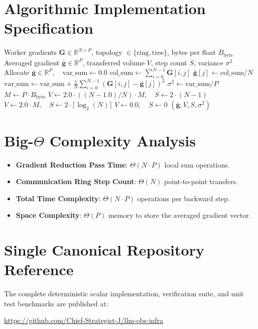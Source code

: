 \documentclass[11pt,a4paper]{article}
\theoremstyle{definition}
\begin{document}
\section{Algorithmic Implementation Specification}

\begin{algorithm}[H]
\caption{Data Parallel All-Reduce Gradient Averaging}
\begin{algorithmic}[1]
\Require Worker gradients $\mathbf{G} \in \mathbb{R}^{N \times P}$, topology $\in \{\text{ring}, \text{tree}\}$, bytes per float $B_{\text{byte}}$
\Ensure Averaged gradient $\bar{\mathbf{g}} \in \mathbb{R}^P$, transferred volume $V$, step count $S$, variance $\sigma^2$
\State Allocate $\bar{\mathbf{g}} \in \mathbb{R}^P, \quad \text{var\_sum} \gets 0.0$
    \State $\text{col\_sum} \gets \sum_{i=0}^{N-1} \mathbf{G}[i, j]$
    \State $\bar{\mathbf{g}}[j] \gets \text{col\_sum} / N$
    \State $\text{var\_sum} \gets \text{var\_sum} + \frac{1}{N} \sum_{i=0}^{N-1} (\mathbf{G}[i, j] - \bar{\mathbf{g}}[j])^2$
\EndFor
\State $\sigma^2 \gets \text{var\_sum} / P$
\State $M \gets P \cdot B_{\text{byte}}$
        \State $V \gets 2.0 \cdot ((N - 1.0) / N) \cdot M, \quad S \gets 2 \cdot (N - 1)$
    \Else
        \State $V \gets 2.0 \cdot M, \quad S \gets 2 \cdot \lceil \log_2(N) \rceil$
    \EndIf
\Else
    \State $V \gets 0.0, \quad S \gets 0$
\EndIf
\State \Return $(\bar{\mathbf{g}}, V, S, \sigma^2)$
\end{algorithmic}
\end{algorithm}

\section{Big-$\Theta$ Complexity Analysis}

\begin{itemize}
    \item \textbf{Gradient Reduction Pass Time}: $\Theta(N \cdot P)$ local sum operations.
    \item \textbf{Communication Ring Step Count}: $\Theta(N)$ point-to-point transfers.
    \item \textbf{Total Time Complexity}: $\Theta(N \cdot P)$ operations per backward step.
    \item \textbf{Space Complexity}: $\Theta(P)$ memory to store the averaged gradient vector.
\end{itemize}

\section{Single Canonical Repository Reference}

The complete deterministic scalar implementation, verification suite, and unit test benchmarks are published at:
\begin{center}
\url{https://github.com/Chief-Strategist-J/llm-obs-infra}
\end{center}
\end{document}
